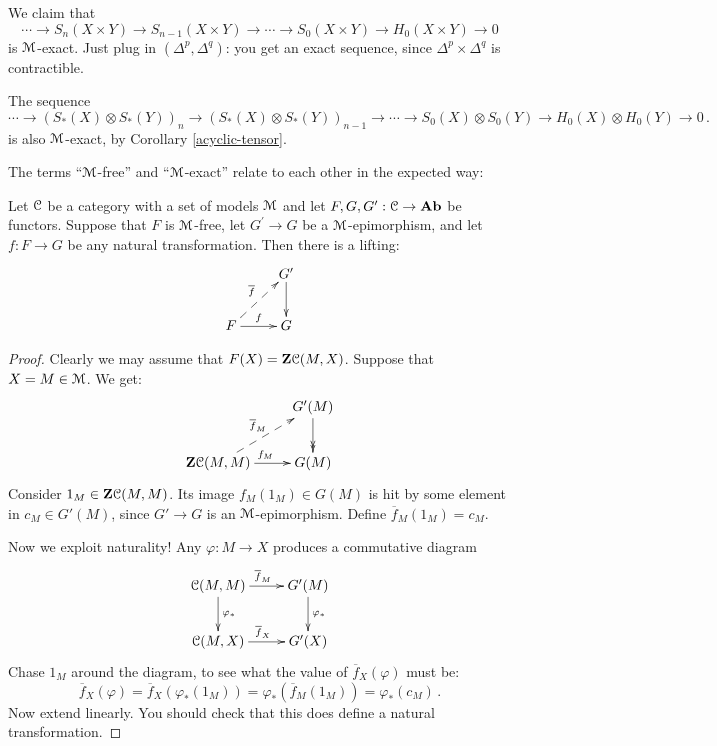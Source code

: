 \begin{example}
We claim that 
\[
\cdots\to S_n(X\times Y)\to S_{n-1}(X\times Y)\to\cdots\to S_0(X\times Y)\to H_0(X\times Y)\to 0
\]
is $\mathcal M$-exact. Just plug in $(\Delta^p,\Delta^q)$: you get an exact sequence, since $\Delta^p\times\Delta^q$ is contractible.
\end{example}
\begin{example}
The sequence
\[
\cdots\to(S_\ast(X)\otimes S_\ast(Y))_n\to(S_\ast(X)\otimes S_\ast(Y))_{n-1}\to
\cdots\to S_0(X)\otimes S_0(Y)\to H_0(X)\otimes H_0(Y)\to 0\,.
\]
is also $\mathcal M$-exact, by Corollary \ref{acyclic-tensor}.
\end{example}
The terms ``$\mathcal M$-free'' and ``$\mathcal M$-exact'' relate to each other in the 
expected way:
\begin{lemma}
Let $\mathcal C$ be a category with a set of models $\mathcal M$ and let $F,G,G^\prime:\mathcal C\to\mathbf{Ab}$ be functors. Suppose that $F$ is $\mathcal M$-free, let $G^\prime\to G$ be a $\mathcal M$-epimorphism, and let $f:F\to G$ be any natural transformation.  
Then there is a lifting:
\begin{equation*}
\xymatrix{ & G^\prime\ar[d]\\
F\ar@{-->}[ur]^{\overline{f}}\ar[r]^f & G}
\end{equation*}
\end{lemma}
\begin{proof}
Clearly we may assume that $F(X)=\mathbf Z\mathcal C(M,X)$. Suppose that $X=M\in\mathcal M$. 
We get:
\begin{equation*}
\xymatrix{ & G^\prime(M)\ar@{->>}[d]\\
\Z\cc(M,M)\ar@{-->}[ur]^{\overline{f}_M}\ar[r]^{f_M} & G(M)}
\end{equation*}
Consider $1_M\in\mathbf Z\mathcal C(M,M)$. Its image  $f_M(1_M)\in G(M)$ is hit by
some element in $c_M\in G'(M)$, since $G'\to G$ is an $\mathcal M$-epimorphism. Define
$\overline f_M(1_M)=c_M$.

Now we exploit naturality! Any $\varphi:M\to X$ produces a commutative 
diagram
\begin{equation*}
\xymatrix{\cc(M,M)\ar[r]^{\overline{f}_M} \ar[d]^{\varphi_*}
& G^\prime(M)\ar[d]^{\varphi_*} \\
\cc(M,X)\ar[r]^{\overline{f}_X} & G^\prime(X)}
\end{equation*}
Chase $1_M$ around the diagram, to see what the value of 
$\overline{f}_X(\varphi)$ must be:
\[
\overline{f}_X(\varphi)=\overline{f}_X(\varphi_*(1_M))=
\varphi_*(\overline{f}_M(1_M))=\varphi_*(c_M)\,.
\]
Now extend linearly. You should check that this does define a natural
transformation. 
\end{proof}

